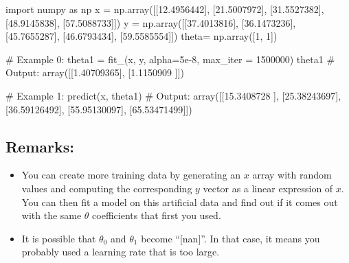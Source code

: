 \documentclass[]{article}
\newenvironment{Shaded}{\begin{snugshade}}{\end{snugshade}}
\newcommand{\CommentTok}[1]{\textcolor[rgb]{0.48,0.49,0.49}{#1}}
\newcommand{\DecValTok}[1]{\textcolor[rgb]{0.96,0.45,0.00}{#1}}
\newcommand{\FloatTok}[1]{\textcolor[rgb]{0.96,0.45,0.00}{#1}}
\newcommand{\ImportTok}[1]{\textcolor[rgb]{0.15,0.68,0.38}{#1}}
\newcommand{\NormalTok}[1]{\textcolor[rgb]{0.81,0.81,0.76}{#1}}
\newcommand{\OperatorTok}[1]{\textcolor[rgb]{0.81,0.81,0.76}{#1}}
\begin{document}
\begin{Shaded}
\begin{Highlighting}[]
\ImportTok{import}\NormalTok{ numpy }\ImportTok{as}\NormalTok{ np}
\NormalTok{x }\OperatorTok{=}\NormalTok{ np.array([[}\FloatTok{12.4956442}\NormalTok{], [}\FloatTok{21.5007972}\NormalTok{], [}\FloatTok{31.5527382}\NormalTok{], [}\FloatTok{48.9145838}\NormalTok{], [}\FloatTok{57.5088733}\NormalTok{]])}
\NormalTok{y }\OperatorTok{=}\NormalTok{ np.array([[}\FloatTok{37.4013816}\NormalTok{], [}\FloatTok{36.1473236}\NormalTok{], [}\FloatTok{45.7655287}\NormalTok{], [}\FloatTok{46.6793434}\NormalTok{], [}\FloatTok{59.5585554}\NormalTok{]])}
\NormalTok{theta}\OperatorTok{=}\NormalTok{ np.array([}\DecValTok{1}\NormalTok{, }\DecValTok{1}\NormalTok{])}

\CommentTok{# Example 0:}
\NormalTok{theta1 }\OperatorTok{=}\NormalTok{ fit_(x, y, alpha}\OperatorTok{=}\FloatTok{5e-8}\NormalTok{, max_iter }\OperatorTok{=} \DecValTok{1500000}\NormalTok{)}
\NormalTok{theta1}
\CommentTok{# Output:}
\NormalTok{array([[}\FloatTok{1.40709365}\NormalTok{],}
\NormalTok{       [}\FloatTok{1.1150909}\NormalTok{ ]])}

\CommentTok{# Example 1:}
\NormalTok{predict(x, theta1)}
\CommentTok{# Output:}
\NormalTok{array([[}\FloatTok{15.3408728}\NormalTok{ ],}
\NormalTok{       [}\FloatTok{25.38243697}\NormalTok{],}
\NormalTok{       [}\FloatTok{36.59126492}\NormalTok{],}
\NormalTok{       [}\FloatTok{55.95130097}\NormalTok{],}
\NormalTok{       [}\FloatTok{65.53471499}\NormalTok{]])}
\end{Highlighting}
\end{Shaded}

\hypertarget{remarks}{%
\subsection{Remarks:}\label{remarks}}

\begin{itemize}
\item
  You can create more training data by generating an \(x\) array with
  random values and computing the corresponding \(y\) vector as a linear
  expression of \(x\). You can then fit a model on this artificial data
  and find out if it comes out with the same \(\theta\) coefficients
  that first you used.
\item
  It is possible that \(\theta_0\) and \(\theta_1\) become
  ``{[}nan{]}''. In that case, it means you probably used a learning
  rate that is too large.
\end{itemize}
\end{document}
